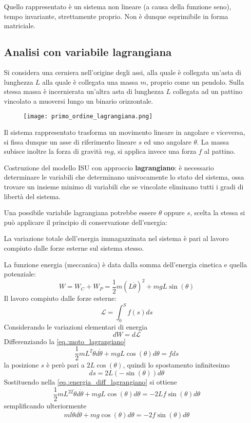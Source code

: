 Quello rappresentato è un sistema non lineare (a causa della funzione seno),
tempo invariante, strettamente proprio. Non è dunque esprimibile in forma
matriciale.

\newpage
\subsection{Analisi con variabile lagrangiana}
Si considera una cerniera nell'origine degli assi, alla quale è collegata
un'asta di lunghezza $L$ alla quale è collegata una massa $m$, proprio come un
pendolo. Sulla stessa massa è incernierata un'altra asta di lunghezza $L$
collegata ad un pattino vincolato a muoversi lungo un binario orizzontale.
\begin{figure}[h]
 \centering
 \texttt{[image: primo\_ordine\_lagrangiana.png]}
 \label{Fig.:variabile_lagrangiana}
\end{figure}

Il sistema rappresentato trasforma un movimento lineare in angolare e
viceversa, si fissa dunque un asse di riferimento lineare $s$ ed uno angolare
$\theta$. La massa subisce inoltre la forza di gravità $mg$, si applica invece
una forza $f$ al pattino.

Costruzione del modello ISU con approccio \textbf{lagrangiano}:
è necessario determinare le variabili che determinano univocamente lo stato del
sistema, ossa trovare un insieme minimo di variabili che se vincolate eliminano
tutti i gradi di libertà del sistema.

Una possibile variabile lagrangiana potrebbe essere $\theta$ oppure $s$, scelta
la stessa si può applicare il principio di conservazione dell'energia:

\begin{emph}
La variazione totale dell'energia immagazzinata nel sistema è pari al lavoro
compiuto dalle forze esterne sul sistema stesso.
\end{emph}

La funzione energia (meccanica) è data dalla somma dell'energia cinetica e
quella potenziale:
\begin{equation}
W = W_C + W_P = \frac{1}{2}m(L\dot\theta)^2 + mgL\sin(\theta)
\label{eq.:moto_lagrangiano}
\end{equation}
Il lavoro compiuto dalle forze esterne:
$$
\mathcal{L} = \int_0^S f(s)ds
$$
Considerando le variazioni elementari di energia
$$
dW = d\mathcal{L}
$$
Differenziando la \ref{eq.:moto_lagrangiano}
$$
\frac{1}{2}mL^2 \dot\theta d\dot\theta + mgL\cos(\theta)d\theta
= fds
\label{eq.:energia_diff_lagrangiano}
$$
la posizione $s$ è però pari a $2L\cos(\theta)$, quindi lo spostamento
infinitesimo
$$
ds = 2L(-\sin(\theta))d\theta
$$
Sostituendo nella \ref{eq.:energia_diff_lagrangiano} si ottiene
$$
\frac{1}{2}mL^22\dot\theta d\dot\theta + mgL \cos(\theta) d\theta =
-2Lf\sin(\theta)d\theta
$$
semplificando ulteriormente
$$
ml\dot\theta d\dot\theta + mg\cos(\theta)d\theta = -2f\sin(\theta)d\theta
$$

